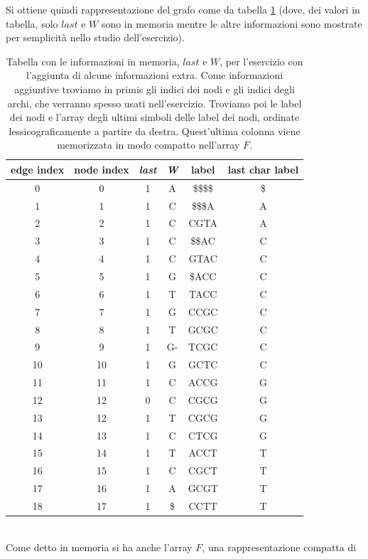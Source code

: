 \documentclass[a4paper,12pt, oneside]{book}
\begin{document}
Si ottiene quindi rappresentazione del grafo come da tabella \ref{tab:dbg}
(dove, dei valori in tabella, solo $last$ e $W$ sono in memoria mentre le altre
informazioni sono mostrate per semplicità nello studio dell'esercizio).
\begin{table}
  \centering
  \begin{tabular}{c|c||c|c||c|c}
    edge index & node index & \textbf{\textit{last}} & \textbf{\textit{W}}
    & label & last char label\\
    \hline
    0 & 0 & 1 & A & \$\$\$\$ & \$ \\
    1 & 1 & 1 & C & \$\$\$A & A \\
    2 & 2 & 1 & C & CGTA & A \\
    3 & 3 & 1 & C & \$\$AC & C \\
    4 & 4 & 1 & C & GTAC & C \\
    5 & 5 & 1 & G & \$ACC & C \\
    6 & 6 & 1 & T & TACC & C \\
    7 & 7 & 1 & G & CCGC & C \\
    8 & 8 & 1 & T & GCGC & C \\
    9 & 9 & 1 & G- & TCGC & C \\
    10 & 10 & 1 & G & GCTC & C \\
    11 & 11 & 1 & C & ACCG & G \\
    12 & 12 & 0 & C & CGCG & G \\
    13 & 12 & 1 & T & CGCG & G \\
    14 & 13 & 1 & C & CTCG & G \\
    15 & 14 & 1 & T & ACCT & T \\
    16 & 15 & 1 & C & CGCT & T \\
    17 & 16 & 1 & A & GCGT & T \\
    18 & 17 & 1 & \$ & CCTT & T \\
  \end{tabular}
  \caption{Tabella con le informazioni in memoria, $last$ e $W$, per l'esercizio
  con l'aggiunta di alcune informazioni extra. Come informazioni aggiuntive
  troviamo in primis gli indici dei nodi e gli indici degli archi, che verranno
  spesso usati nell'esercizio. Troviamo poi le label dei nodi e l'array degli
  ultimi simboli delle label dei nodi, ordinate lessicograficamente a partire da
  destra. Quest'ultima colonna viene memorizzata in modo compatto nell'array
  $F$.} 
  \label{tab:dbg}
\end{table}
\\
\noindent
Come detto in memoria si ha anche l'array $F$, una rappresentazione compatta di
\end{document}
